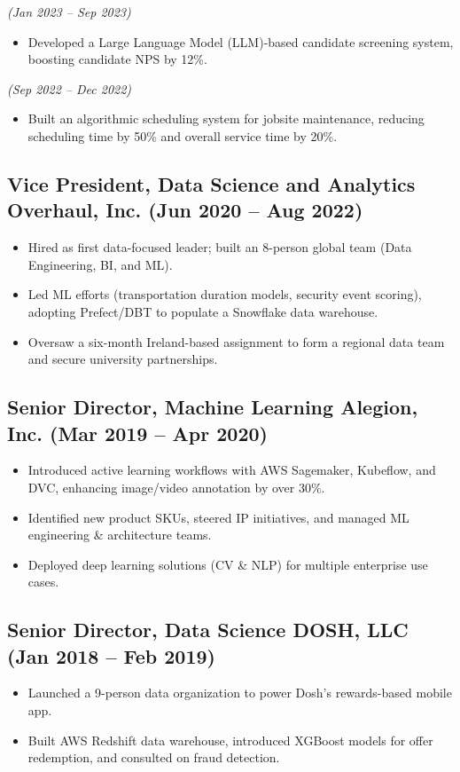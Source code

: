\documentclass[11pt]{article}
\begin{document}
\textit{(Jan 2023 -- Sep 2023)}
\begin{itemize}[leftmargin=*]
  \item Developed a Large Language Model (LLM)-based candidate screening system, boosting candidate NPS by 12\%.
\end{itemize}

\textit{(Sep 2022 -- Dec 2022)}
\begin{itemize}[leftmargin=*]
  \item Built an algorithmic scheduling system for jobsite maintenance, reducing scheduling time by 50\% and overall service time by 20\%.
\end{itemize}

\subsection*{Vice President, Data Science and Analytics \hfill Overhaul, Inc. (Jun 2020 -- Aug 2022)}
\begin{itemize}[leftmargin=*]
  \item Hired as first data-focused leader; built an 8-person global team (Data Engineering, BI, and ML).
  \item Led ML efforts (transportation duration models, security event scoring), adopting Prefect/DBT to populate a Snowflake data warehouse.
  \item Oversaw a six-month Ireland-based assignment to form a regional data team and secure university partnerships.
\end{itemize}

\subsection*{Senior Director, Machine Learning \hfill Alegion, Inc. (Mar 2019 -- Apr 2020)}
\begin{itemize}[leftmargin=*]
  \item Introduced active learning workflows with AWS Sagemaker, Kubeflow, and DVC, enhancing image/video annotation by over 30\%.
  \item Identified new product SKUs, steered IP initiatives, and managed ML engineering \& architecture teams.
  \item Deployed deep learning solutions (CV \& NLP) for multiple enterprise use cases.
\end{itemize}

\subsection*{Senior Director, Data Science \hfill DOSH, LLC (Jan 2018 -- Feb 2019)}
\begin{itemize}[leftmargin=*]
  \item Launched a 9-person data organization to power Dosh’s rewards-based mobile app.
  \item Built AWS Redshift data warehouse, introduced XGBoost models for offer redemption, and consulted on fraud detection.
\end{itemize}
\end{document}
